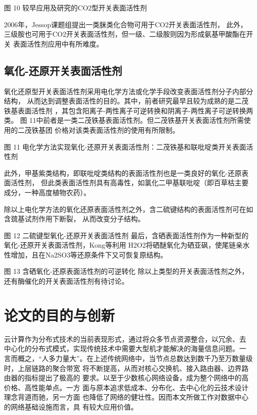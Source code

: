 \documentclass[bachelor,winfonts]{jnuthesis} %
\begin{document}
    图 10 较早应用及研究的CO2型开关表面活性剂
    
    2006年，Jessop课题组\cite{liu2006science}提出一类脒类化合物可用于CO2开关表面活性剂，
    此外，三级胺也可用于CO2开关表面活性剂，但一级、二级胺则因为形成氨基甲酸酯在开关
    表面活性剂应用中有所难度\cite{jessop2012}。
    \subsection{氧化-还原开关表面活性剂}
    氧化还原型开关表面活性剂采用电化学方法或化学手段改变表面活性剂分子内部分结构，
    从而达到调整表面活性的目的。其中，前者研究最早且较为成熟的是二茂铁基表面活性剂
    ，其包含阳离子-两性离子可逆转换和阴离子-两性离子可逆转换两类\cite{李云霞2011}。
    图 11中前者是一类二茂铁基表面活性剂。但二茂铁基开关表面活性剂所需使用的二茂铁基团
    价格对该类表面活性剂的使用有所限制。
    
    图 11 电化学方法实现氧化-还原开关表面活性剂：二茂铁基和联吡啶类开关表面活性剂
    
    此外，甲基紫类结构，即联吡啶类结构的表面活性剂也是一类良好的氧化-还原表面活性剂，
    但此类表面活性剂具有高毒性，如氯化二甲基联吡啶（即百草枯主要成分，一种高度植物农药）。
    
    除以上电化学方法的氧化还原表面活性剂之外，含二硫键结构的表面活性剂可在如含巯基试剂作用下断裂，
    从而改变分子结构。
    
    图 12 二硫键型氧化-还原开关表面活性剂
    最后，含硒表面活性剂作为一种新型的氧化-还原开关表面活性剂，Kong等\cite{kong2016redox}利用
    H2O2将硒醚氧化为硒亚砜，使尾链亲水性增加，且在Na2SO3等还原条件下又可恢复原结构。
    
    图 13 含硒氧化-还原表面活性剂的可逆转化\cite{kong2016redox}
    除以上类型的开关表面活性剂之外，还有酶催化\cite{ku2011}的开关表面活性剂有待讨论。
    

    \section{论文的目的与创新}
    云计算作为分布式技术的当前表现形式，通过将众多节点资源整合，以冗余、去
    中心化的分布式模式，实现传统技术中需要大型机才能解决的海量信息问题。一
    言而概之，“人多力量大”。在上述传统网络中，当节点总数达到数千乃至万数量级时，上层链路的聚合带宽
    将不断提高，从而对核心交换机、接入路由器、边界路由器的指标提出了极高的
    要求。以至于少数核心网络设备，成为整个网络中的高价格、高性能单点。一方
    面与原本追求低成本、分布化、去中心化的云技术设计理念背道而驰，另一方面
    也降低了网络的健壮性。因而本文所做工作对数据中心的网络基础设施而言，具
    有较大应用价值。
    
\end{document}

